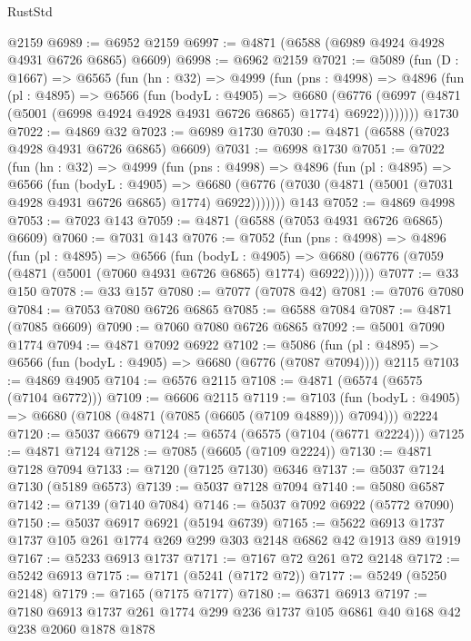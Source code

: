 \begin{lexlean}{RustStd}
\begin{coremodule}
{\begin{coremodule}
{{{{{{{{{{{{{{{{{{{{{{{{{{{{{    @2159
@6989 := @6952 @2159
@6997 := @4871 (@6588 (@6989 @4924 @4928 @4931 @6726 @6865) @6609)
@6998 := @6962 @2159
@7021 := @5089
    (fun (D : @1667) =>
    @6565
      (fun (hn : @32) =>
      @4999
        (fun (pns : @4998) =>
        @4896
          (fun (pl : @4895) =>
          @6566
            (fun (bodyL : @4905) =>
            @6680
              (@6776 (@6997 (@4871 (@5001 (@6998 @4924 @4928 @4931 @6726 @6865) @1774) @6922))))))))
    @1730
@7022 := @4869 @32
@7023 := @6989 @1730
@7030 := @4871 (@6588 (@7023 @4928 @4931 @6726 @6865) @6609)
@7031 := @6998 @1730
@7051 := @7022
    (fun (hn : @32) =>
    @4999
      (fun (pns : @4998) =>
      @4896
        (fun (pl : @4895) =>
        @6566
          (fun (bodyL : @4905) =>
          @6680 (@6776 (@7030 (@4871 (@5001 (@7031 @4928 @4931 @6726 @6865) @1774) @6922)))))))
    @143
@7052 := @4869 @4998
@7053 := @7023 @143
@7059 := @4871 (@6588 (@7053 @4931 @6726 @6865) @6609)
@7060 := @7031 @143
@7076 := @7052
    (fun (pns : @4998) =>
    @4896
      (fun (pl : @4895) =>
      @6566
        (fun (bodyL : @4905) =>
        @6680 (@6776 (@7059 (@4871 (@5001 (@7060 @4931 @6726 @6865) @1774) @6922))))))
@7077 := @33 @150
@7078 := @33 @157
@7080 := @7077 (@7078 @42)
@7081 := @7076 @7080
@7084 := @7053 @7080 @6726 @6865
@7085 := @6588 @7084
@7087 := @4871 (@7085 @6609)
@7090 := @7060 @7080 @6726 @6865
@7092 := @5001 @7090 @1774
@7094 := @4871 @7092 @6922
@7102 := @5086
    (fun (pl : @4895) => @6566 (fun (bodyL : @4905) => @6680 (@6776 (@7087 @7094))))
    @2115
@7103 := @4869 @4905
@7104 := @6576 @2115
@7108 := @4871 (@6574 (@6575 (@7104 @6772)))
@7109 := @6606 @2115
@7119 := @7103
    (fun (bodyL : @4905) => @6680 (@7108 (@4871 (@7085 (@6605 (@7109 @4889))) @7094)))
    @2224
@7120 := @5037 @6679
@7124 := @6574 (@6575 (@7104 (@6771 @2224)))
@7125 := @4871 @7124
@7128 := @7085 (@6605 (@7109 @2224))
@7130 := @4871 @7128 @7094
@7133 := @7120 (@7125 @7130) @6346
@7137 := @5037 @7124 @7130 (@5189 @6573)
@7139 := @5037 @7128 @7094
@7140 := @5080 @6587
@7142 := @7139 (@7140 @7084)
@7146 := @5037 @7092 @6922 (@5772 @7090)
@7150 := @5037 @6917 @6921 (@5194 @6739)
@7165 := @5622 @6913 @1737 @1737 @105 @261 @1774 @269 @299 @303 @2148 @6862 @42 @1913 @89 @1919
@7167 := @5233 @6913 @1737
@7171 := @7167 @72 @261 @72 @2148
@7172 := @5242 @6913
@7175 := @7171 (@5241 (@7172 @72))
@7177 := @5249 (@5250 @2148)
@7179 := @7165 (@7175 @7177)
@7180 := @6371 @6913
@7197 := @7180
    @6913
    @1737
    @261
    @1774
    @299
    @236
    @1737
    @105
    @6861
    @40
    @168
    @42
    @238
    @2060
    @1878
    @1878
}}}}}}}}}}}}}}}}}}}}}}}}}}}}}
\end{coremodule}}
\end{coremodule}
\end{lexlean}
